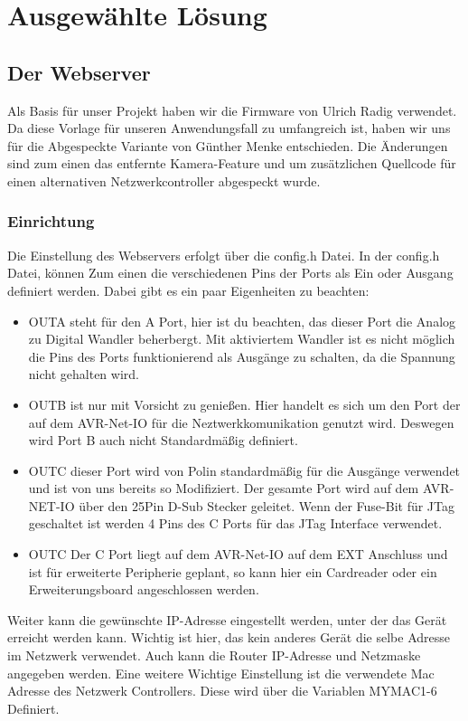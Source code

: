 \chapter{Ausgewählte Lösung}

\section{Der Webserver}

Als Basis für unser Projekt haben wir die Firmware von Ulrich Radig verwendet.
Da diese Vorlage für unseren Anwendungsfall zu umfangreich ist,  haben wir uns 
für die Abgespeckte Variante von Günther Menke entschieden. Die Änderungen sind
zum einen das entfernte Kamera-Feature und um zusätzlichen Quellcode für einen
alternativen Netzwerkcontroller abgespeckt wurde.

\subsection{Einrichtung}

Die Einstellung des Webservers erfolgt über die \textrm{config.h} Datei. In der
\textrm{config.h} Datei, können Zum einen die verschiedenen Pins der Ports als Ein oder
Ausgang definiert werden. Dabei gibt es ein paar Eigenheiten zu beachten:
\begin{itemize}
  \item OUTA steht für den A Port, hier ist du beachten, das dieser Port die
  Analog zu Digital Wandler beherbergt. Mit aktiviertem Wandler ist es nicht
  möglich die Pins des Ports funktionierend als Ausgänge zu schalten, da die
  Spannung nicht gehalten wird.
  \item OUTB ist nur mit Vorsicht zu genießen. Hier handelt es sich um den Port
  der auf dem AVR-Net-IO für die Neztwerkkomunikation genutzt wird. Deswegen
  wird Port B auch nicht Standardmäßig definiert.
  \item OUTC dieser Port wird von Polin standardmäßig für die Ausgänge verwendet
  und ist von uns bereits so Modifiziert. Der gesamte Port wird auf dem
  AVR-NET-IO über den 25Pin D-Sub Stecker geleitet. Wenn der Fuse-Bit für JTag
  geschaltet ist werden 4 Pins des C Ports für das JTag Interface verwendet.
  \item OUTC Der C Port liegt auf dem AVR-Net-IO auf dem EXT Anschluss und ist
  für erweiterte Peripherie geplant, so kann hier ein Cardreader oder ein
  Erweiterungsboard angeschlossen werden.
\end{itemize}
Weiter kann die gewünschte IP-Adresse eingestellt werden, unter der das Gerät
erreicht werden kann. Wichtig ist hier, das kein anderes Gerät die selbe Adresse
im Netzwerk verwendet. Auch kann die Router IP-Adresse und Netzmaske angegeben
werden. Eine weitere Wichtige Einstellung ist die verwendete Mac Adresse
des Netzwerk Controllers. Diese wird über die Variablen MYMAC1-6 Definiert.

